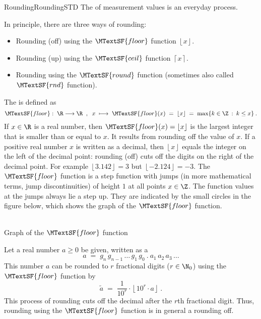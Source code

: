 \begin{MXContent}{Rounding}{Rounding}{STD}
The  of measurement values is an everyday process.

\begin{MInfo}

In principle, there are three ways of rounding:

\begin{itemize}
\item{Rounding (off) using the $\MTextSF{floor}$ function $\left\lfloor{x}\right\rfloor$.}
\item{Rounding (up) using the $\MTextSF{ceil}$ function $\left\lceil{ x}\right\rceil$.}
\item{Rounding using the $\MTextSF{round}$ function (sometimes also called $\MTextSF{rnd}$ function).}
\end{itemize}
\end{MInfo}

The  is defined as
$$
\MTextSF{floor}:\; \R\longrightarrow\R\;\; , \;\;
x\;\longmapsto\; \MTextSF{floor}(x)\;=\; \left\lfloor{ x}\right\rfloor\;=\; \max\lbrace k\in\Z\: :\: k\leq x\rbrace\: .
$$
If $x\in\R$ is a real number, then $\MTextSF{floor}(x)=\left\lfloor{ x}\right\rfloor$ is the largest integer 
that is smaller than or equal to $x$. It results from rounding off the value of $x$. If a positive 
real number $x$ is written as a decimal, then $\left\lfloor{ x}\right\rfloor$ equals the 
integer on the left of the decimal point: rounding (off) cuts off the digits on the right of the decimal point. 
For example $\left\lfloor{ 3.142}\right\rfloor=3$ but $\left\lfloor{ -2.124}\right\rfloor=-3$.
The $\MTextSF{floor}$ function is a step function with jumps (in more mathematical terms, jump discontinuities) of height $1$ at all points 
$x\in \Z$. The function values at the jumps always lie a step up. They are indicated by the small circles in 
the figure below, which shows the graph of the $\MTextSF{floor}$ function. 

\begin{center}
\\
Graph of the $\MTextSF{floor}$ function
\end{center}

Let a real number $a\geq 0$ be given, written as a 
$$
a \;=\; g_n\, g_{n-1}\, \ldots\, g_1\, g_0\: .\: a_1\,a_2\, a_3\, \ldots
$$
This number $a$ can be rounded to $r$ fractional digits ($r\in\N_0$) using the $\MTextSF{floor}$ function by
$$
\tilde a \;=\; \frac1{10^r}\cdot \left\lfloor{ 10^r\cdot a}\right\rfloor\: .
$$
This process of rounding cuts off the decimal after the $r$th fractional digit. Thus, rounding 
using the $\MTextSF{floor}$ function is in general a rounding off.


\end{MXContent}
